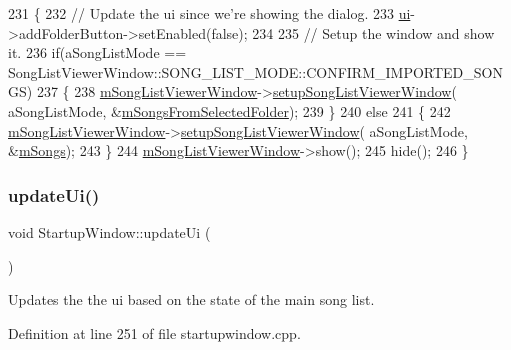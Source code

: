 \begin{DoxyCode}
231 \{
232     \textcolor{comment}{// Update the ui since we're showing the dialog.}
233     \mbox{\hyperlink{class_startup_window_a5afeeaabe9a34a02a67d2e7d9f36dc09}{ui}}->addFolderButton->setEnabled(\textcolor{keyword}{false});
234 
235     \textcolor{comment}{// Setup the window and show it.}
236     \textcolor{keywordflow}{if}(aSongListMode == SongListViewerWindow::SONG\_LIST\_MODE::CONFIRM\_IMPORTED\_SONGS)
237     \{
238         \mbox{\hyperlink{class_startup_window_a26e72433e3cf3d35ae49d77d91f5cc38}{mSongListViewerWindow}}->\mbox{\hyperlink{class_song_list_viewer_window_ae26127c85ed57885461c5143be4ae1e9}{setupSongListViewerWindow}}(
      aSongListMode, &\mbox{\hyperlink{class_startup_window_af419f4809f6fae0b370f1d9112dae9b4}{mSongsFromSelectedFolder}});
239     \}
240     \textcolor{keywordflow}{else}
241     \{
242         \mbox{\hyperlink{class_startup_window_a26e72433e3cf3d35ae49d77d91f5cc38}{mSongListViewerWindow}}->\mbox{\hyperlink{class_song_list_viewer_window_ae26127c85ed57885461c5143be4ae1e9}{setupSongListViewerWindow}}(
      aSongListMode, &\mbox{\hyperlink{class_startup_window_ae57241505d74639131cb0ece2cfc922b}{mSongs}});
243     \}
244     \mbox{\hyperlink{class_startup_window_a26e72433e3cf3d35ae49d77d91f5cc38}{mSongListViewerWindow}}->show();
245     hide();
246 \}
\end{DoxyCode}
\mbox{\label{class_startup_window_a910d56e4b640d6b7b27a6de2ae18d736}} 
\subsubsection{\texorpdfstring{update\+Ui()}{updateUi()}}
{\footnotesize\ttfamily void Startup\+Window\+::update\+Ui (\begin{DoxyParamCaption}{ }\end{DoxyParamCaption})\hspace{0.3cm}{\ttfamily [private]}}



Updates the the ui based on the state of the main song list. 



Definition at line 251 of file startupwindow.\+cpp.


